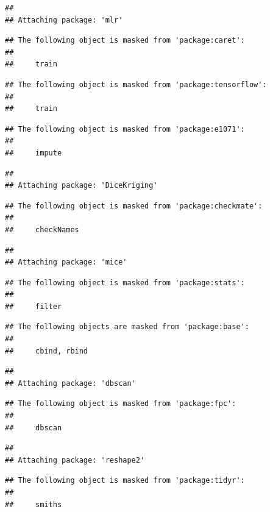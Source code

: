 \documentclass[
]{article}
\begin{document}
\begin{verbatim}
## 
## Attaching package: 'mlr'
\end{verbatim}

\begin{verbatim}
## The following object is masked from 'package:caret':
## 
##     train
\end{verbatim}

\begin{verbatim}
## The following object is masked from 'package:tensorflow':
## 
##     train
\end{verbatim}

\begin{verbatim}
## The following object is masked from 'package:e1071':
## 
##     impute
\end{verbatim}

\begin{verbatim}
## 
## Attaching package: 'DiceKriging'
\end{verbatim}

\begin{verbatim}
## The following object is masked from 'package:checkmate':
## 
##     checkNames
\end{verbatim}

\begin{verbatim}
## 
## Attaching package: 'mice'
\end{verbatim}

\begin{verbatim}
## The following object is masked from 'package:stats':
## 
##     filter
\end{verbatim}

\begin{verbatim}
## The following objects are masked from 'package:base':
## 
##     cbind, rbind
\end{verbatim}

\begin{verbatim}
## 
## Attaching package: 'dbscan'
\end{verbatim}

\begin{verbatim}
## The following object is masked from 'package:fpc':
## 
##     dbscan
\end{verbatim}

\begin{verbatim}
## 
## Attaching package: 'reshape2'
\end{verbatim}

\begin{verbatim}
## The following object is masked from 'package:tidyr':
## 
##     smiths
\end{verbatim}
\end{document}
